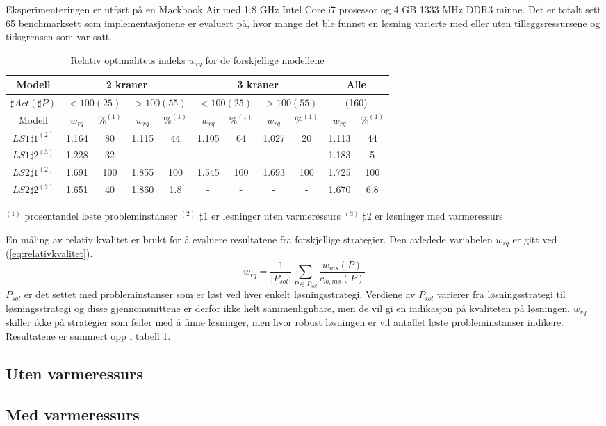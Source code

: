 Eksperimenteringen er utført på en Mackbook Air med 1.8 GHz Intel Core i7 prosessor og 4 GB 1333 MHz DDR3 minne. Det er totalt sett 65 benchmarksett som implementasjonene er evaluert på, hvor mange det ble funnet en løsning varierte med eller uten tilleggsressursene og tidsgrensen som var satt.

\begin{table}[h]
\begin{center}
\begin{tabular}{ | c | c | c | c | c | c | c | c | c | c | c | }
\hline
\textbf{Modell} & \multicolumn{4}{|c|}{\textbf{2 kraner}} & \multicolumn{4}{|c|}{\textbf{3 kraner}} & \multicolumn{2}{|c|}{\textbf{Alle}} \\ \hline
$\sharp Act(\sharp P)$ & \multicolumn{2}{|c|}{$< 100 (25)$} & \multicolumn{2}{|c|}{$> 100 (55)$} & \multicolumn{2}{|c|}{$< 100 (25)$} & \multicolumn{2}{|c|}{$> 100 (55)$} & \multicolumn{2}{|c|}{(160)} \\ 
\hline
Modell & $w_{rq}$ & $\%^{(1)}$ & $w_{rq}$ & $\%^{(1)}$  & $w_{rq}$ & $\%^{(1)}$ & $w_{rq}$ & $\%^{(1)}$ & $w_{rq}$ & $\%^{(1)}$ \\ \hline
$LS1 \sharp 1^{(2)}$ & 1.164 & 80 & 1.115 & 44 & 1.105 & 64 & 1.027 & 20 & 1.113 & 44 \\
$LS1 \sharp 2^{(3)}$ & 1.228 & 32 & - & - & - & - & - & - & 1.183 & 5 \\
$LS2 \sharp 1^{(2)}$ & 1.691 & 100 & 1.855 & 100 & 1.545 & 100 & 1.693 & 100 & 1.725 & 100 \\
$LS2 \sharp 2^{(3)}$ & 1.651 & 40 & 1.860 & 1.8 & - & - & - & - & 1.670 & 6.8 \\
\hline
\end{tabular}
\end{center}
\caption{Relativ optimalitets indeks $w_{rq}$ for de forskjellige modellene}
\label{tab:resultaterSum}
\end{table}
$^{(1)}$ prosentandel løste probleminstanser
$^{(2)}$ $\sharp 1$ er løsninger uten varmeressurs
$^{(3)}$ $\sharp 2$ er løsninger med varmeressurs

En måling av relativ kvalitet er brukt for å evaluere resultatene fra forskjellige strategier. Den avledede variabelen $w_{rq}$ er gitt ved (\ref{eq:relativkvalitet}).
\begin{equation}
w_{rq} = \frac{1}{| P_{sol} |} \sum_{P \in P_{sol}} \frac{w_{ms}(P)}{c_{lb,ms}(P)}
\label{eq:relativkvalitet}
\end{equation}
$P_{sol}$ er det settet med probleminstanser som er løst ved hver enkelt løsningsstrategi. Verdiene av $P_{sol}$ varierer fra løsningsstrategi til løsningsstrategi og disse gjennomsnittene er derfor ikke helt sammenlignbare, men de vil gi en indikasjon på kvaliteten på løsningen. $w_{rq}$ skiller ikke på strategier som feiler med å finne løsninger, men hvor robust løsningen er vil antallet løste probleminstanser indikere. Resultatene er summert opp i tabell \ref{tab:resultaterSum}.

\subsection{Uten varmeressurs}


\subsection{Med varmeressurs}
